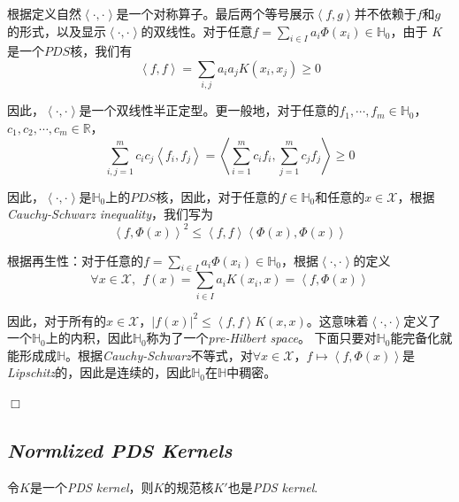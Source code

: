根据定义自然$\left< \cdot,\cdot \right>$是一个对称算子。最后两个等号展示$\left< f,g \right>$并不依赖于$f$和$g$的形式，以及显示$\left< \cdot,\cdot \right>$的双线性。对于任意$f=\sum_{i\in I} a_i\Phi(x_i)\in \mathbb{H}_0$，由于
$K$是一个$PDS$核，我们有
\begin{equation}
    \left<f,f\right>=\sum_{i,j} a_i a_j K(x_i,x_j)\geqslant 0
\end{equation}

因此，$\left< \cdot,\cdot \right>$是一个双线性半正定型。更一般地，对于任意的$f_1,\cdots,f_m\in \mathbb{H}_0$，$c_1,c_2,\cdots,c_m\in \mathbb{R}$，
\begin{equation}
    \sum_{i,j=1}^{m}c_ic_j\left< f_i,f_j \right>=\left< \sum_{i=1}^{m}c_if_i,\sum_{j=1}^{m}c_jf_j \right>\geqslant 0
\end{equation}

因此，$\left< \cdot,\cdot \right>$是$\mathbb{H}_0$上的$PDS$核，因此，对于任意的$f\in \mathbb{H}_0$和任意的$x\in \mathcal{X}$，根据\textsl{Cauchy-Schwarz inequality}，我们写为
\begin{equation}
    \left< f,\Phi(x) \right>^2\leqslant \left<f,f\right>\left<\Phi(x),\Phi(x)\right>
\end{equation}

根据再生性：对于任意的$f=\sum_{i\in I}a_i\Phi(x_i)\in \mathbb{H}_0$，根据$\left<\cdot,\cdot\right>$的定义
\begin{equation}
    \forall x\in \mathcal{X},\ \ f(x)=\sum_{i\in I}a_i K(x_i,x)=\left<f,\Phi(x)\right>
\end{equation}

因此，对于所有的$x\in \mathcal{X}$，$|f(x)|^2\leqslant \left<f,f\right>K(x,x)$。这意味着$\left<\cdot,\cdot\right>$定义了一个$\mathbb{H}_0$上的内积，因此$\mathbb{H}_0$称为了一个\textsl{pre-Hilbert space}。
下面只要对$\mathbb{H}_0$能完备化就能形成成$\mathbb{H}$。根据\textsl{Cauchy-Schwarz}不等式，对$\forall x\in \mathcal{X}$，$f\mapsto \left<f,\Phi(x)\right>$是\textsl{Lipschitz}的，因此是连续的，因此$\mathbb{H}_0$在$\mathbb{H}$中稠密。

$\Box$

\subsection*{\textsl{Normlized PDS Kernels}}

\begin{mdframed}
    \begin{lemma}
        令$K$是一个\textsl{PDS kernel}，则$K$的规范核$K'$也是\textsl{PDS kernel}.
    \end{lemma}
\end{mdframed}

